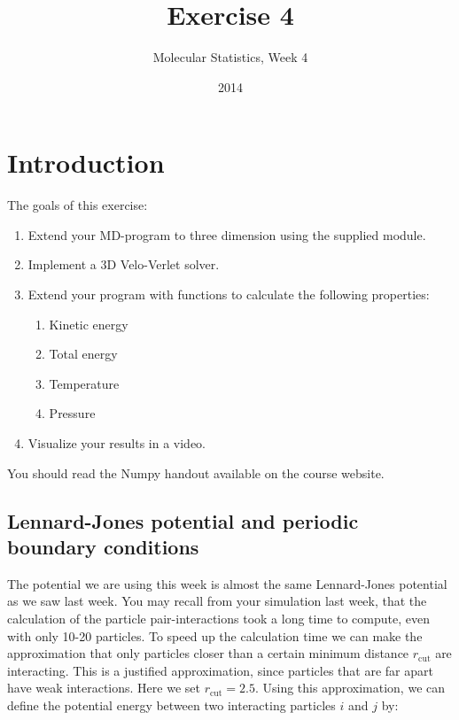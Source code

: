 \documentclass{article}
\title{Exercise 4}
\author{Molecular Statistics, Week 4}
\date{2014}
\begin{document}

\maketitle

\section{Introduction}

The goals of this exercise:
\begin{enumerate}
    \item Extend your MD-program to three dimension using the supplied module.

    \item Implement a 3D Velo-Verlet solver.

    \item Extend your program with functions to calculate the following properties:
    \begin{enumerate}
        \item Kinetic energy
        \item Total energy
        \item Temperature
        \item Pressure
    \end{enumerate}

    \item Visualize your results in a video.

\end{enumerate}


You should read the Numpy handout available on the course website.


\subsection{Lennard-Jones potential and periodic boundary conditions}

The potential we are using this week is almost the same Lennard-Jones potential
as we saw last week.  You may recall from your simulation last week, that the
calculation of the particle pair-interactions took a long time to compute, even
with only 10-20 particles.
To speed up the calculation time we can make the approximation that only
particles closer than a certain minimum distance $r_{\mathrm{cut}}$ are
interacting.
This is a justified approximation, since particles that are
far apart have weak interactions.
Here we set $r_{\mathrm{cut}} = 2.5$.
Using this approximation, we can define the potential energy between two
interacting particles $i$ and $j$ by:
\end{document}

